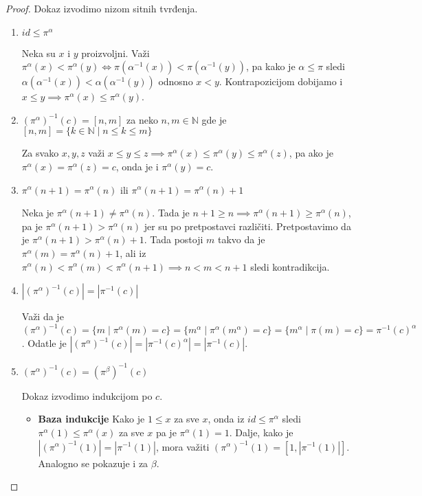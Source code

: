 \documentclass[12pt,oneside]{memoir}
\theoremstyle{definition}
\begin{document}
  \begin{proof}
	  Dokaz izvodimo nizom sitnih tvrđenja.

	  \begin{enumerate}
		  \item $id \leq \pi^\alpha$

			  Neka su $x$ i $y$ proizvoljni. Važi $\pi^\alpha(x) <
			  \pi^\alpha(y) \iff \pi(\alpha^{-1}(x)) < \pi(\alpha^{-1}(y))$, pa
			  kako je $\alpha \leq \pi$ sledi $\alpha(\alpha^{-1}(x)) <
			  \alpha(\alpha^{-1}(y))$ odnosno $x < y$. Kontrapozicijom dobijamo
			  i $x \leq y \implies \pi^\alpha(x) \leq \pi^\alpha(y)$.

		  \item $(\pi^\alpha)^{-1}(c) = [n, m]$ za neko $n, m \in \mathbb{N}$
			  gde je $[n, m] = \{k \in \mathbb{N} \mid n \leq k \leq m\}$

			  Za svako $x, y, z $ važi $x \leq y \leq z \implies \pi^\alpha(x)
			  \leq \pi^\alpha(y) \leq \pi^\alpha(z)$, pa ako je $\pi^\alpha(x)
			  = \pi^\alpha(z) = c$, onda je i $\pi^\alpha(y) = c$.

		  \item $\pi^\alpha(n + 1) = \pi^\alpha(n)$ ili $\pi^\alpha(n+1) =
			  \pi^\alpha(n) + 1$

			  Neka je $\pi^\alpha(n+1) \neq \pi^\alpha(n)$. Tada je $n + 1 \geq
			  n \implies \pi^\alpha(n+1) \geq \pi^\alpha(n)$, pa je
			  $\pi^\alpha(n+1) > \pi^\alpha(n)$ jer su po pretpostavci
			  različiti. Pretpostavimo da je $\pi^\alpha(n+1) > \pi^\alpha(n) +
			  1$. Tada postoji $m$ takvo da je $\pi^\alpha(m) = \pi^\alpha(n) +
			  1$, ali iz $\pi^\alpha(n) < \pi^\alpha(m) < \pi^\alpha(n+1)
			  \implies n < m < n + 1$ sledi kontradikcija.

		  \item $|(\pi^\alpha)^{-1}(c)| = |\pi^{-1}(c)|$

			  Važi da je $(\pi^\alpha)^{-1}(c) = \{m \mid \pi^\alpha(m) = c\} =
			  \{m^\alpha \mid \pi^\alpha(m^\alpha) = c\} = \{m^\alpha \mid
			  \pi(m) = c\} = \pi^{-1}(c)^\alpha$. Odatle je
			  $|(\pi^\alpha)^{-1}(c)| = |\pi^{-1}(c)^\alpha| = |\pi^{-1}(c)|$.

		  \item $(\pi^\alpha)^{-1}(c) = (\pi^\beta)^{-1}(c)$

			  Dokaz izvodimo indukcijom po $c$.

			  \begin{itemize}
				  \item[] \textbf{Baza indukcije} Kako je $1 \leq x$ za sve
					  $x$, onda iz $id \leq \pi^\alpha$ sledi $\pi^\alpha(1)
					  \leq \pi^\alpha(x)$ za sve $x$ pa je $\pi^\alpha(1) = 1$.
					  Dalje, kako je $|(\pi^\alpha)^{-1}(1)| = |\pi^{-1}(1)|$,
					  mora važiti $(\pi^\alpha)^{-1}(1) = [1, |\pi^{-1}(1)|]$.
					  Analogno se pokazuje i za $\beta$.


\end{itemize}
\end{enumerate}
\end{proof}
\end{document}
